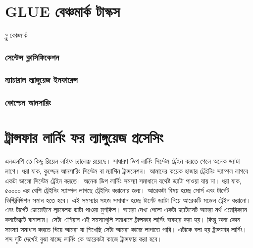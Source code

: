 \documentclass{book}
\begin{document}
\chapter{GLUE বেঞ্চমার্ক টাস্কস}
গ্লু বেঞ্চমার্ক \cite{wang-etal-2018-glue}

\subsection{সেন্টেন্স ক্লাসিফিকেশন}
\subsection{ন্যাচারাল ল্যাঙ্গুয়েজ  ইনফারেন্স}
\subsection{কোশ্চেন আনসারিং}


\chapter{ট্রান্সফার লার্নিং ফর ল্যাঙ্গুয়েজ প্রসেসিং}
এনএলপি তে কিছু রিয়েল লাইফ চ্যালেঞ্জ রয়েছে। সাধারণ ডিপ লার্নিং সিস্টেম ট্রেইন করতে গেলে অনেক ড্যাটা লাগে। ধরা যাক, কুশ্ছেন আনসারিং সিস্টেম বা ম্যাশিন ট্রান্সলেশন। আমাদের কয়েক হাজার ট্রেইনিং স্যাম্পল লাগবে একটা ভালো সিস্টেম ট্রেইন করতে।  অনেক ডিপ লার্নিং সমস্যা সমাধানে যথেষ্ট ড্যাটা পাওয়া যায় না। ধরা যাক, ৫০০০০ এর বেশি ট্রেইনিং স্যাম্পল লাগছে ট্রেইনিং করানোর জন্য। আরেকটা বিষয় হচ্ছে সোর্স এবং টার্গেট ডিস্ট্রিবিউশন সমান হতে হবে। এই সমস্যার সহজ সমাধান হচ্ছে টার্গেট ড্যাটা নিয়ে আরেকটি মডেল ট্রেইন করানো। এবং টার্গেট ডোমেইনে ল্যাবেলড ডাটা পাওয়া মুশকিল। আমরা দেখা গেলো একটা ড্যাটাসেট আমরা নর্থ এমেরিক্যান কনটেক্সটে বানালাম। সেটা এশিয়ান এই সমস্যাগুলি সমাধানে ট্রান্সফার লার্নিং ব্যবহার করা হয়। কিন্তু অন্য কোন সমস্যা সমাধান করতে গিয়ে আমরা যা শিখেছি সেটা আমরা কাজে লাগাতে পারি। এটাকে বলা হয় ট্রান্সফার লার্নিং। শব্দ দুটি দেখেই বুঝা যাচ্ছে লার্নিং কে আরেকটা কাজে ট্রান্সফার করা হবে। 
\end{document}
